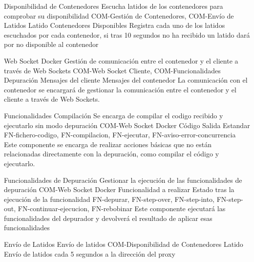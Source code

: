 \begin{component}{Disponibilidad de Contenedores}
{Escucha latidos de los contenedores para comprobar su disponibilidad }
{COM-Gestión de Contenedores, COM-Envío de Latidos} %
{Latido} %
{Contenedores Disponibles} %
{\NA} %
Registra cada uno de los latidos escuchados por cada contenedor, si tras 10 segundos no ha recibido un latido dará por no disponible al contenedor %
\end{component}


\begin{component}{Web Socket Docker}
{Gestión de comunicación entre el contenedor y el cliente a través de Web Sockets}
{COM-Web Socket Cliente, COM-Funcionalidades Depuración} %
{Mensajes del cliente} %
{Mensajes del contenedor} %
{\NA} %
La comunicación con el contenedor se encargará de gestionar la comunicación entre el contenedor y el cliente a través de Web Sockets. %
\end{component}

\begin{component}{Funcionalidades Compilación}
{Se encarga de compilar el codigo recibido y ejecutarlo sin modo depuración}
{COM-Web Socket Docker}
{Código}
{Salida Estandar}
{FN-fichero-codigo, FN-compilacion, FN-ejecutar, FN-aviso-error-concurrencia}
Este componente se encarga de realizar acciones básicas que no están relacionadas directamente con la depuración, como compilar el código y ejecutarlo.
\end{component}

\begin{component}{Funcionalidades de Depuración}
{Gestionar la ejecución de las funcionalidades de depuración}
{COM-Web Socket Docker} %
{Funcionalidad a realizar} %
{Estado tras la ejecución de la funcionalidad} %
{FN-depurar, FN-step-over, FN-step-into, FN-step-out, FN-continuar-ejecucion, FN-rebobinar} %
Este componente ejecutará las funcionalidades del depurador y devolverá el resultado de aplicar esas funcionalidades %
\end{component}

\begin{component}{Envío de Latidos}
{Envío de latidos}
{COM-Disponibilidad de Contenedores} %
{Latido} %
{\NA} %
{\NA} %
Envío de latidos cada 5 segundos a la dirección del proxy
\end{component}

